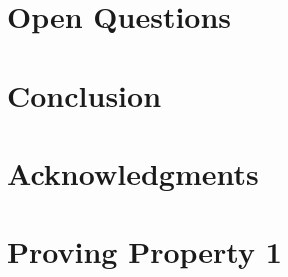 \documentclass[11pt,titlepage]{article}
\begin{document}
\section{Open Questions}

\section{Conclusion}

\section*{Acknowledgments}


\appendix
\section{Proving Property 1}
\label{appendix:prop1}




\end{document}
